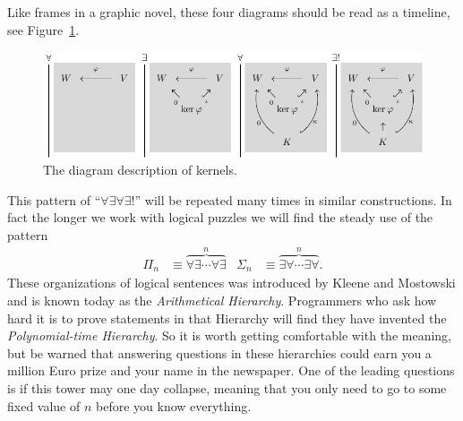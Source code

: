 \documentclass[12pt,twoside,dvipsnames,letterpaper]{memoir}
\begin{document}
Like frames in a graphic novel, these four diagrams should be read 
as a timeline, see Figure~\ref{fig:kernel-diag}.  
\begin{figure}[!htbp]
\begin{center}
    \includegraphics[width=\textwidth]{kernel-graphic.pdf}
\end{center}
\caption{The diagram description of kernels.}
\label{fig:kernel-diag}
\end{figure}

This pattern of 
``$\forall \exists\forall\exists!$'' will be repeated many times in similar 
constructions.  In fact the longer we work with logical puzzles we will 
find the steady use of the pattern 
\begin{align*}
    \Pi_n & \equiv \overbrace{\forall \exists\cdots \forall \exists}^n
    & 
    \Sigma_n & \equiv \overbrace{\exists\forall\cdots \exists\forall}^n.
\end{align*}
These organizations of logical sentences was introduced by Kleene and 
Mostowski and is known today as the \emph{Arithmetical Hierarchy}.
Programmers who ask how hard it is to prove statements in that Hierarchy 
will find they have invented the \emph{Polynomial-time Hierarchy}.
So it is worth getting comfortable with the meaning, but be warned 
that answering questions in these hierarchies could earn you a million Euro 
prize and your name in the newspaper.  One of the leading questions 
is if this tower may one day collapse, meaning that you only need to go 
to some fixed value of $n$ before you know everything.
\end{document}
